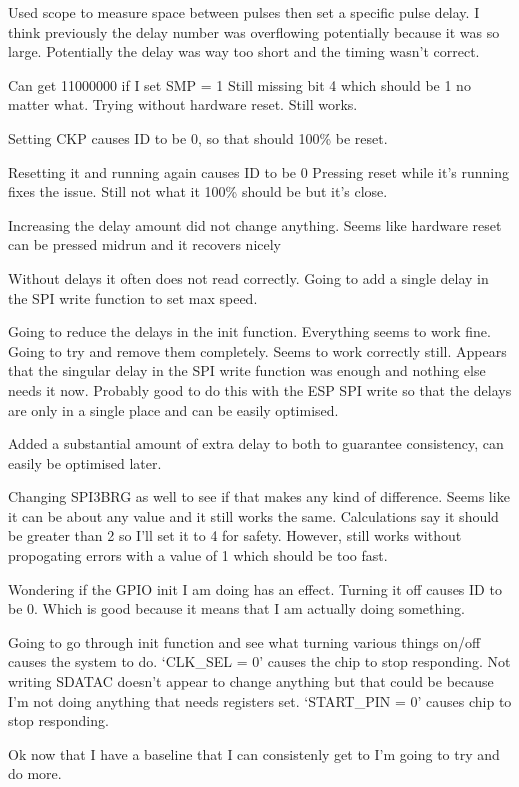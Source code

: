 Used scope to measure space between pulses then set a specific pulse delay.
I think previously the delay number was overflowing potentially because it was so large.
Potentially the delay was way too short and the timing wasn't correct.

Can get 11000000 if I set SMP = 1
Still missing bit 4 which should be 1 no matter what.
Trying without hardware reset. Still works.

Setting CKP causes ID to be 0, so that should 100\% be reset.

Resetting it and running again causes ID to be 0
Pressing reset while it's running fixes the issue.
Still not what it 100\% should be but it's close.

Increasing the delay amount did not change anything.
Seems like hardware reset can be pressed midrun and it recovers nicely

Without delays it often does not read correctly.
Going to add a single delay in the SPI write function to set max speed.

Going to reduce the delays in the init function. Everything seems to work fine.
Going to try and remove them completely. Seems to work correctly still.
Appears that the singular delay in the SPI write function was enough and nothing else
needs it now. Probably good to do this with the ESP SPI write so that the delays are
only in a single place and can be easily optimised.

Added a substantial amount of extra delay to both to guarantee consistency, can easily
be optimised later.

Changing SPI3BRG as well to see if that makes any kind of difference.
Seems like it can be about any value and it still works the same.
Calculations say it should be greater than 2 so I'll set it to 4 for safety.
However, still works without propogating errors with a value of 1 which
should be too fast.

Wondering if the GPIO init I am doing has an effect. Turning it off causes ID to be 0.
Which is good because it means that I am actually doing something.

Going to go through init function and see what turning various things on/off
causes the system to do.
`CLK\_SEL = 0' causes the chip to stop responding.
Not writing SDATAC doesn't appear to change anything but that could be because I'm not
doing anything that needs registers set.
`START\_PIN = 0' causes chip to stop responding.

Ok now that I have a baseline that I can consistenly get to I'm going to try and do more.


